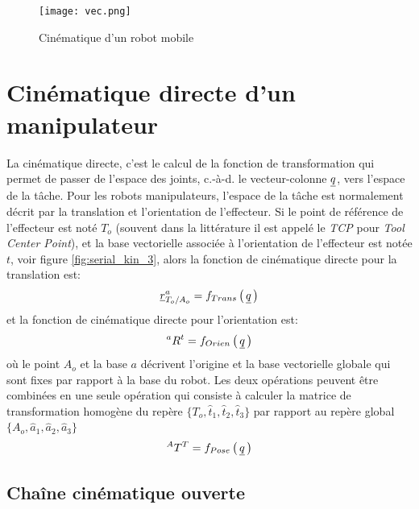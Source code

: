 \begin{figure}[H]
	\centering
	\texttt{[image: vec.png]}
	\caption{Cinématique d'un robot mobile}
	\label{fig:vec}
\end{figure}



\newpage
\section{Cinématique directe d'un manipulateur}
\label{sec:fwdkin}

La cinématique directe, c'est le calcul de la fonction de transformation qui permet de passer de l'espace des joints, c.-à-d. le vecteur-colonne $\underline{q}$, vers l'espace de la tâche. Pour les robots manipulateurs, l'espace de la tâche est normalement décrit par la translation et l'orientation de l'effecteur.  Si le point de référence de l'effecteur est noté $T_o$ (souvent dans la littérature il est appelé le \textit{TCP} pour \textit{Tool Center Point}), et la base vectorielle associée à l'orientation de l'effecteur est notée $t$, voir figure \ref{fig:serial_kin_3}, alors la fonction de cinématique directe pour la translation est:
\begin{equation}
	\underline{r}_{T_o/A_o}^a = f_{Trans}\left( \, \underline{q} \, \right)
	\label{eq:kinfwdtrans}
\end{equation}
et la fonction de cinématique directe pour l'orientation est:
\begin{equation}
{}^aR^t = f_{Orien}\left( \, \underline{q} \, \right)
\label{eq:kinfwdrot}
\end{equation}
où le point $A_o$ et la base $a$ décrivent l'origine et la base vectorielle globale qui sont fixes par rapport à la base du robot. Les deux opérations peuvent être combinées en une seule opération qui consiste à calculer la matrice de transformation homogène du repère $\{T_o,\hat{t}_1,\hat{t}_2,\hat{t}_3\}$ par rapport au repère global $\{A_o,\hat{a}_1,\hat{a}_2,\hat{a}_3\}$
\begin{equation}
{}^AT^T = f_{Pose}\left( \, \underline{q} \, \right)
\label{eq:kinfwdpose}
\end{equation}


\subsection{Chaîne cinématique ouverte}

